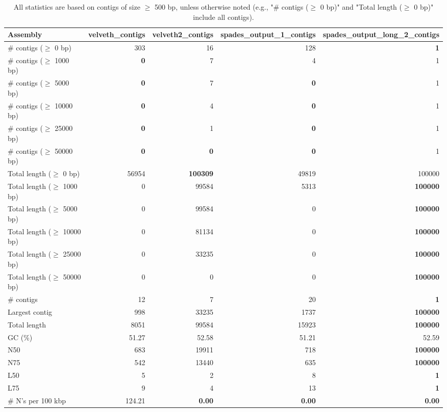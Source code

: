 \documentclass[12pt,a4paper]{article}
\begin{document}
\begin{table}[ht]
\begin{center}
\caption{All statistics are based on contigs of size $\geq$ 500 bp, unless otherwise noted (e.g., "\# contigs ($\geq$ 0 bp)" and "Total length ($\geq$ 0 bp)" include all contigs).}
\begin{tabular}{|l*{4}{|r}|}
\hline
Assembly & velveth\_contigs & velveth2\_contigs & spades\_output\_1\_contigs & spades\_output\_long\_2\_contigs \\ \hline
\# contigs ($\geq$ 0 bp) & 303 & 16 & 128 & {\bf 1} \\ \hline
\# contigs ($\geq$ 1000 bp) & {\bf 0} & 7 & 4 & 1 \\ \hline
\# contigs ($\geq$ 5000 bp) & {\bf 0} & 7 & {\bf 0} & 1 \\ \hline
\# contigs ($\geq$ 10000 bp) & {\bf 0} & 4 & {\bf 0} & 1 \\ \hline
\# contigs ($\geq$ 25000 bp) & {\bf 0} & 1 & {\bf 0} & 1 \\ \hline
\# contigs ($\geq$ 50000 bp) & {\bf 0} & {\bf 0} & {\bf 0} & 1 \\ \hline
Total length ($\geq$ 0 bp) & 56954 & {\bf 100309} & 49819 & 100000 \\ \hline
Total length ($\geq$ 1000 bp) & 0 & 99584 & 5313 & {\bf 100000} \\ \hline
Total length ($\geq$ 5000 bp) & 0 & 99584 & 0 & {\bf 100000} \\ \hline
Total length ($\geq$ 10000 bp) & 0 & 81134 & 0 & {\bf 100000} \\ \hline
Total length ($\geq$ 25000 bp) & 0 & 33235 & 0 & {\bf 100000} \\ \hline
Total length ($\geq$ 50000 bp) & 0 & 0 & 0 & {\bf 100000} \\ \hline
\# contigs & 12 & 7 & 20 & {\bf 1} \\ \hline
Largest contig & 998 & 33235 & 1737 & {\bf 100000} \\ \hline
Total length & 8051 & 99584 & 15923 & {\bf 100000} \\ \hline
GC (\%) & 51.27 & 52.58 & 51.21 & 52.59 \\ \hline
N50 & 683 & 19911 & 718 & {\bf 100000} \\ \hline
N75 & 542 & 13440 & 635 & {\bf 100000} \\ \hline
L50 & 5 & 2 & 8 & {\bf 1} \\ \hline
L75 & 9 & 4 & 13 & {\bf 1} \\ \hline
\# N's per 100 kbp & 124.21 & {\bf 0.00} & {\bf 0.00} & {\bf 0.00} \\ \hline
\end{tabular}
\end{center}
\end{table}
\end{document}

